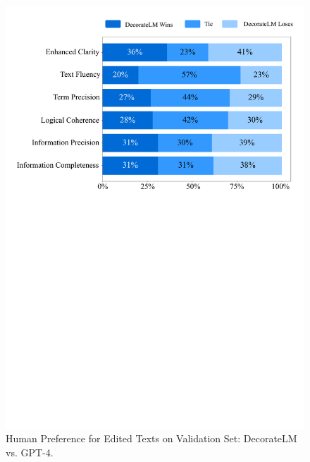 \documentclass[11pt]{article}
\begin{document}

\begin{figure}[t]
    \centering
    \includegraphics[width=0.8\columnwidth]{figs/winrate.pdf}
    \caption{Human Preference for Edited Texts on Validation Set: DecorateLM vs. GPT-4.}
    \label{fig:editing human}
\end{figure}
\end{document}
